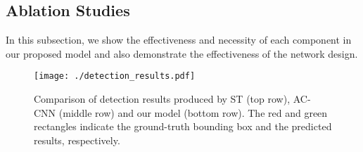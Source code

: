 \documentclass[journal]{IEEEtran}
\begin{document}
\subsection{Ablation Studies}
\label{sec:ablation}
In this subsection, we show the effectiveness and necessity of each component in our proposed model and also demonstrate the effectiveness of the network design. %

\begin{figure*}
\centering
  \texttt{[image: ./detection\_results.pdf]}
	\caption{Comparison of detection results produced by ST
		\cite{gupta2016cross} (top row), AC-CNN 
		\cite{li2016attentive} (middle row) and our model (bottom row). 	
		The red and green rectangles indicate the ground-truth bounding box and the predicted results, respectively.}
\label{fig:detection results}
\end{figure*}
\end{document}
